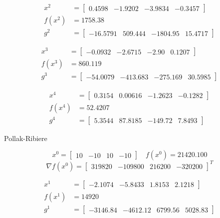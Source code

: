 \documentclass[12pt]{article}
\begin{document}
\begin{align*}
    x^2 &= \begin{bmatrix}
        0.4598 & -1.9202 & -3.9834 & -0.3457
    \end{bmatrix} \\
    f(x^2) &= 1758.38 \\
    g^2 &= \begin{bmatrix}
        -16.5791 & 509.444 & -1804.95 & 15.4717
    \end{bmatrix}
\end{align*}


\begin{align*}
    x^3 &= \begin{bmatrix}
        -0.0932 & -2.6715 & -2.90 & 0.1207
    \end{bmatrix} \\
    f(x^3) &= 860.119 \\
    g^3 &= \begin{bmatrix}
        -54.0079 & -413.683 & -275.169 & 30.5985
    \end{bmatrix}
\end{align*}


\begin{align*}
    x^4 &= \begin{bmatrix}
        0.3154 & 0.00616 & -1.2623 & -0.1282
    \end{bmatrix} \\
    f(x^4) &= 52.4207\\
    g^4 &= \begin{bmatrix}
        5.3544 & 87.8185 & -149.72 & 7.8493
    \end{bmatrix}
\end{align*}

Pollak-Ribiere

\[x^0 = \begin{bmatrix}
    10 &-10 & 10 & -10
\end{bmatrix} \quad f(x^0) = 21420.100\]
\[\nabla f(x^0) = \begin{bmatrix}
    319820 & -109800 & 216200 & -320200
\end{bmatrix}^T\]


\begin{align*}
    x^1 &= \begin{bmatrix}
        -2.1074 & -5.8433 & 1.8153 & 2.1218
    \end{bmatrix} \\
    f(x^1) &= 14920\\
    g^1 &= \begin{bmatrix}
        -3146.84 & -4612.12 & 6799.56 & 5028.83
    \end{bmatrix}
\end{align*}
\end{document}

